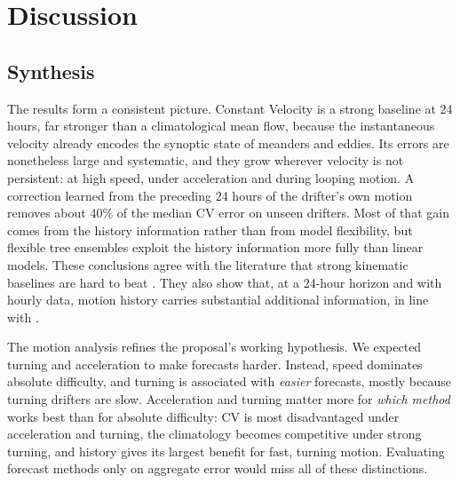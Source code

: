 \section{Discussion}\label{sec:discussion}

\subsection{Synthesis}
The results form a consistent picture. Constant Velocity is a strong baseline at 24 hours, far stronger than a climatological mean flow, because the instantaneous velocity already encodes the synoptic state of meanders and eddies. Its errors are nonetheless large and systematic, and they grow wherever velocity is not persistent: at high speed, under acceleration and during looping motion. A correction learned from the preceding 24 hours of the drifter's own motion removes about 40\% of the median CV error on unseen drifters. Most of that gain comes from the history information rather than from model flexibility, but flexible tree ensembles exploit the history information more fully than linear models. These conclusions agree with the literature that strong kinematic baselines are hard to beat \citep{grossi2025,lin2026}. They also show that, at a 24-hour horizon and with hourly data, motion history carries substantial additional information, in line with \citet{aksamit2020}.

The motion analysis refines the proposal's working hypothesis. We expected turning and acceleration to make forecasts harder. Instead, speed dominates absolute difficulty, and turning is associated with \emph{easier} forecasts, mostly because turning drifters are slow. Acceleration and turning matter more for \emph{which method} works best than for absolute difficulty: CV is most disadvantaged under acceleration and turning, the climatology becomes competitive under strong turning, and history gives its largest benefit for fast, turning motion. Evaluating forecast methods only on aggregate error would miss all of these distinctions.


